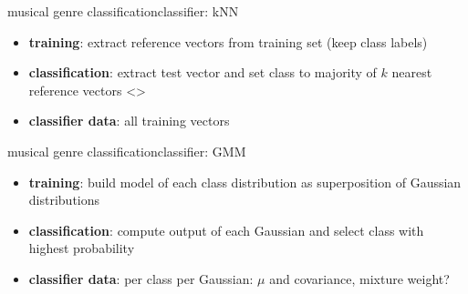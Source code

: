         \begin{frame}{musical genre classification}{classifier: kNN}
            \begin{itemize}
                \item	\textbf{training}: extract reference vectors from training set (keep class labels)
                \item<2->	\textbf{classification}: extract test vector and set class to majority of $k$ nearest reference vectors
                \setcounter{i}{1}
                \setcounter{j}{2}
                {
                    \only<\value{j}>{}
                }
                \item<6->	\textbf{classifier data}: all training vectors
            \end{itemize}
        \end{frame}
        \begin{frame}{musical genre classification}{classifier: GMM}
            \begin{itemize}
                \item	\textbf{training}: build model of each class distribution as superposition of Gaussian distributions
                \item<2->	\textbf{classification}: compute output of each Gaussian and select class with highest probability
                \item<3->	\textbf{classifier data}: per class per Gaussian: $\mu$ and covariance, mixture weight?
            \end{itemize}
        \end{frame}
